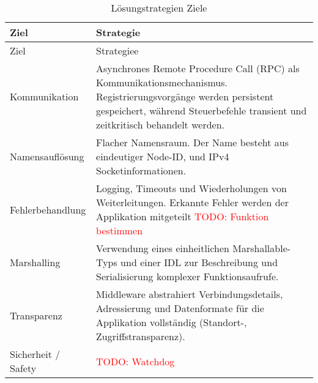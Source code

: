 \begin{longtable}{|>{\raggedright\arraybackslash}p{4cm}|>{\raggedright\arraybackslash}p{10cm}|}
	\caption{Lösungstrategien Ziele} \label{tab:loesungsstrategieZiele} \\
	\hline
	Ziel & Strategie \\
	\hline
	\endfirsthead
	
	\hline
	Ziel & Strategiee\\
	\hline
	\endhead
	
	\hline
	\endfoot
	
	Kommunikation &
	Asynchrones Remote Procedure Call (RPC) als Kommunikationsmechanismus. Registrierungsvorgänge werden persistent gespeichert, während Steuerbefehle transient und zeitkritisch behandelt werden.  
	\\
	\hline
	Namensauflösung
	& Flacher Namensraum. Der Name besteht aus eindeutiger Node-ID, und IPv4 Socketinformationen. 
	\\
	\hline
	Fehlerbehandlung
	& Logging, Timeouts und Wiederholungen von Weiterleitungen. Erkannte Fehler werden der Applikation mitgeteilt \textcolor{red}{TODO: Funktion bestimmen}
	\\
	\hline
	Marshalling
	& Verwendung eines einheitlichen Marshallable-Typs und einer IDL zur Beschreibung und Serialisierung komplexer Funktionsaufrufe.
	\\
	\hline
	Transparenz
	& Middleware abstrahiert Verbindungsdetails, Adressierung und Datenformate für die Applikation vollständig (Standort-, Zugriffstransparenz).
	\\
	\hline
	Sicherheit / Safety
	& \textcolor{red}{TODO: Watchdog }
	\\
	\hline
	
\end{longtable}


